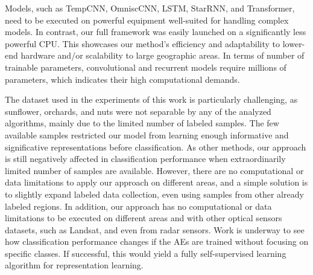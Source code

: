 \documentclass[journal,article,submit,pdftex,moreauthors]{Definitions/mdpi}
\begin{document}
Models, such as TempCNN, OmniscCNN, LSTM, StarRNN, and Transformer, need to be executed on powerful equipment well-suited for handling complex models. In contrast, our full framework was easily launched on a significantly less powerful CPU. This showcases our method's efficiency and adaptability to lower-end hardware and/or scalability to large geographic areas.
In terms of number of trainable parameters, convolutional and recurrent models require millions of parameters, which indicates their high computational demands. 



The dataset used in the experiments of this work is particularly challenging, as sunflower, orchards, and nuts were not separable by any of the analyzed algorithms, mainly due to the limited number of labeled samples. The few available samples restricted our model from learning enough informative and significative representations before classification.
As other methods, our approach is still negatively affected in classification performance when extraordinarily limited number of samples are available. However, there are no computational or data limitations to apply our approach on different areas, and a simple solution is to slightly expand labeled data collection, even using samples from other already labeled regions.
In addition, our approach has no computational or data limitations to be executed on different areas and with other optical sensors datasets, such as Landsat, and even from radar sensors.
Work is underway to see how classification performance changes if the AEs are trained without focusing on specific classes. If successful, this would yield a fully self-supervised learning algorithm for representation learning.
\end{document}
